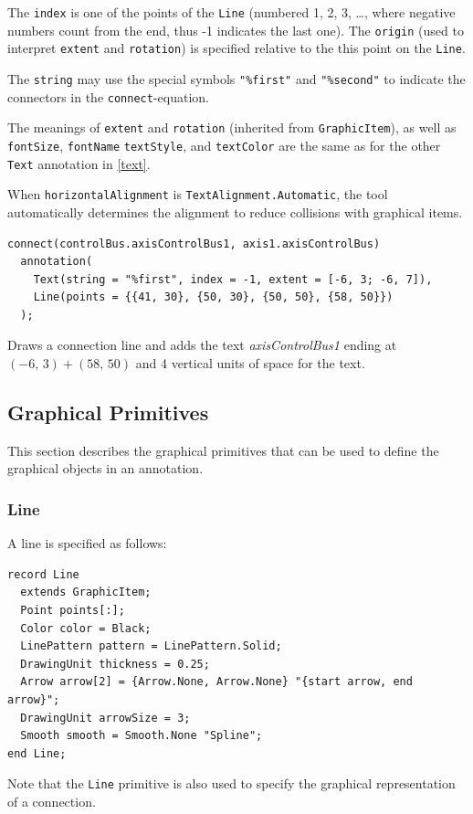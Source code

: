 The \lstinline!index! is one of the points of the \lstinline!Line! (numbered 1, 2, 3, \ldots{}, where negative numbers count from the end, thus -1 indicates the last one).
The \lstinline!origin! (used to interpret \lstinline!extent! and \lstinline!rotation!) is specified relative to the this point on the \lstinline!Line!.

The \lstinline!string! may use the special symbols \lstinline!"%first"! and \lstinline!"%second"! to indicate the connectors in the \lstinline!connect!-equation.

The meanings of \lstinline!extent! and \lstinline!rotation! (inherited from \lstinline!GraphicItem!), as well as \lstinline!fontSize!, \lstinline!fontName! \lstinline!textStyle!, and \lstinline!textColor! are the same as for the other \lstinline!Text! annotation in \cref{text}.

When \lstinline!horizontalAlignment! is \lstinline!TextAlignment.Automatic!, the tool automatically determines the alignment to reduce collisions with graphical items.

\begin{example}
\begin{lstlisting}[language=modelica]
connect(controlBus.axisControlBus1, axis1.axisControlBus)
  annotation(
    Text(string = "%first", index = -1, extent = [-6, 3; -6, 7]),
    Line(points = {{41, 30}, {50, 30}, {50, 50}, {58, 50}})
  );
\end{lstlisting}
Draws a connection line and adds the text \emph{axisControlBus1} ending at $(-6,\, 3) + (58,\, 50)$ and 4 vertical units of space for the text.
\end{example}

\subsection{Graphical Primitives}\label{graphical-primitives}

This section describes the graphical primitives that can be used to define the graphical objects in an annotation.

\subsubsection{Line}\label{line}

A line is specified as follows:
\begin{lstlisting}[language=modelica]
record Line
  extends GraphicItem;
  Point points[:];
  Color color = Black;
  LinePattern pattern = LinePattern.Solid;
  DrawingUnit thickness = 0.25;
  Arrow arrow[2] = {Arrow.None, Arrow.None} "{start arrow, end arrow}";
  DrawingUnit arrowSize = 3;
  Smooth smooth = Smooth.None "Spline";
end Line;
\end{lstlisting}%
Note that the \lstinline!Line! primitive is also used to specify the graphical representation of a connection.

